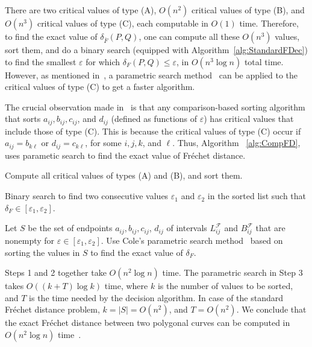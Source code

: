 \documentclass[12pt]{dalthesis}
\newcommand{\lee}{\leqslant}
\newcommand{\eps}{\varepsilon}
\newcommand{\CF}{{\mathscr F}}
\newcommand{\Frechet}{Fr\'echet }
\newcommand{\distF}{\delta_F}
\newcommand{\distFS}{\delta_{\bar{F}}} \newcommand{\distWeakF}{\delta_{\bar{N}}} \newcommand{\distClosedF}{\delta_{\bar{C}}} \newcommand{\distPartialF}{\delta_{\bar{P}}} \newcommand{\distGrpahF}{\delta_{\bar{G}}} \newcommand{\distDisF}{\delta_{dF}} \newcommand{\distGeoF}{\delta_{\hat{F}}} \newcommand{\distHomF}{\delta_{h}} \newcommand{\distC}{\delta_C} \newcommand{\distSetF}{\delta_{\CF}}
\newcommand{\LF}{L^\CF}
\newcommand{\BF}{B^\CF}
\begin{document}
There are two critical values of type (A), 
$O(n^2)$ critical values of type (B), and $O(n^3)$ critical values of type (C),
each computable in $O(1)$ time.
Therefore, to find the exact value of $\distFS(P,Q)$,
one can compute all these $O(n^3)$ values, sort them, 
and do a binary search (equipped with Algorithm~\ref{alg:StandardFDec})
to find the smallest $\eps$ for which $\distF(P,Q) \lee \eps$,
in $O(n^3 \log n)$ total time.
However, as mentioned in~\cite{AltG95},
a parametric search method~\cite{Megiddo83,Cole87} can be applied
to the critical values of type (C) to get a faster algorithm.

The crucial observation made in~\cite{AltG95} is that
any comparison-based sorting algorithm that sorts
$a_{ij}, b_{ij}, c_{ij}$, and $d_{ij}$ (defined as functions of $\eps$)
has critical values that include those of type (C).
This is because the critical values of type (C) occur if 
$a_{ij} = b_{k\ell}$ or $d_{ij} = c_{k\ell}$, 
for some $i,j,k$, and $\ell$. Thus, Algorithm ~\ref{alg:CompFD}, 
uses parametic search to find the exact value of \Frechet distance.

\begin{algorithm} [t]
\caption {\sc Standard \Frechet Computation Algorithm~\cite{AltG95} } \label{alg:CompFD}
\begin{algorithmic}[1]
	\vspace{0.5em}
	\baselineskip

\STATE Compute all critical values of types (A) and (B), and sort them.
	
	\STATE Binary search to find two consecutive values  $\eps_1$ and $\eps_2$ in  the sorted list
	such that $\distF \in [\eps_1,\eps_2]$.
	
	\STATE Let $S$ be the set of endpoints $a_{ij}, b_{ij}, c_{ij}$, $d_{ij}$ of intervals  
	$\LF_{ij}$ and $\BF_{ij}$ that are nonempty for $\eps \in [\eps_1,\eps_2]$.
	Use Cole's parametric search method~\cite{Cole87}  based on sorting the values in $S$ 
	to find the exact value of $\distF$.

\end{algorithmic}
\end{algorithm}




Steps 1 and 2 together take $O(n^2\log n)$ time. 
The parametric search in Step 3 takes $O(( k + T ) \log k)$ time,
where $k$ is the number of values to be sorted, 
and $T$ is the time needed by the decision algorithm.
In case of the standard \Frechet distance problem, $k = |S| = O(n^2)$, and $T = O(n^2)$.
We conclude that the exact \Frechet distance between two polygonal curves 
can be computed in $O(n^2 \log n)$ time~\cite{AltG95}. 
\end{document}
